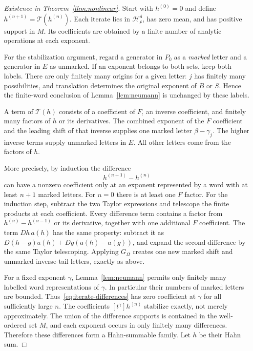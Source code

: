 \documentclass[11pt,letterpaper]{article}
\theoremstyle{definition}
\theoremstyle{remark}
\newcommand{\HH}{\mathcal H}
\newcommand{\Gom}{G_{\Omega}}
\numberwithin{equation}{section}
\begin{document}
\begin{proof}[Existence in Theorem~\ref{thm:nonlinear}]
Start with $h^{(0)}=0$ and define $h^{(n+1)}=\mathcal T(h^{(n)})$.
Each iterate lies in $\HH_\rho^d$, has zero mean, and has positive support in
$M$.  Its coefficients are obtained by a finite number of analytic
operations at each exponent.

For the stabilization argument, regard a generator in $P_0$ as a
\emph{marked} letter and a generator in $E$ as unmarked.  If an exponent
belongs to both sets, keep both labels.  There are only finitely many
origins for a given letter: $j$ has finitely many possibilities, and
translation determines the original exponent of $B$ or $S$.  Hence the
finite-word conclusion of Lemma~\ref{lem:neumann} is unchanged by these
labels.

A term of $\mathcal T(h)$ consists of a coefficient of $F$, an inverse
coefficient, and finitely many factors of $h$ or its derivatives.  The
combined exponent of the $F$ coefficient and the leading shift of that
inverse supplies one marked letter $\beta-\gamma_j$.  The higher inverse
terms supply unmarked letters in $E$.  All other letters come from the
factors of $h$.

More precisely, by induction the difference
\begin{equation}\label{eq:iterate-differences}
 h^{(n+1)}-h^{(n)}
\end{equation}
can have a nonzero coefficient only at an exponent represented by a word
with at least $n+1$ marked letters.  For $n=0$ there is at least one $F$
factor.  For the induction step, subtract the two Taylor expressions and
telescope the finite products at each coefficient.  Every difference term
contains a factor from $h^{(n)}-h^{(n-1)}$ or its derivative, together with
one additional $F$ coefficient.  The term $Dh\,a(h)$ has the same property:
subtract it as $D(h-g)a(h)+Dg(a(h)-a(g))$, and expand the second difference
by the same Taylor telescoping.  Applying $\Gom$ creates one new marked
shift and unmarked inverse-tail letters, exactly as above.

For a fixed exponent $\gamma$, Lemma~\ref{lem:neumann} permits only finitely
many labelled word representations of $\gamma$.  In particular their
numbers of marked letters are bounded.  Thus~\eqref{eq:iterate-differences}
has zero coefficient at $\gamma$ for all sufficiently large $n$.
The coefficients $[t^\gamma]h^{(n)}$ stabilize exactly, not merely
approximately.  The union of the difference supports is contained in the
well-ordered set $M$, and each exponent occurs in only finitely many
differences.  Therefore these differences form a Hahn-summable family.
Let $h$ be their Hahn sum.


\end{proof}
\end{document}
